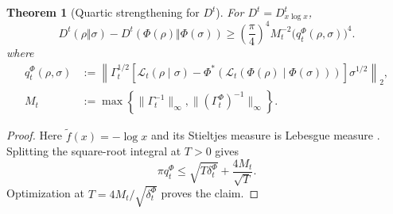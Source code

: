 \documentclass[11pt]{article}
\newtheorem{theorem}[theorem]{Theorem}
\theoremstyle{remark}
\newcommand{\1}{\mathbbm{1}}
\begin{document}
\begin{theorem}[Quartic strengthening for $D^t$]
\label{thm:consolidated-Dt-quartic}
For $D^t=D_{x\log x}^t$,
\begin{equation}
 \boxed{
 D^t(\rho\Vert\sigma)-D^t(\Phi(\rho)\Vert\Phi(\sigma))
 \geq\left(\frac\pi4\right)^4M_t^{-2}
 \bigl(q_t^\Phi(\rho,\sigma)\bigr)^4.}
 \label{eq:consolidated-Dt-quartic}
\end{equation}
where
\begin{align*}
 q_t^\Phi(\rho,\sigma)
 &:=\left\lVert\Gamma_t^{1/2}\left[
 \mathcal L_t(\rho\mid\sigma)
 -\Phi^*\!\left(\mathcal L_t(\Phi(\rho)\mid\Phi(\sigma))\right)
 \right]\sigma^{1/2}\right\rVert_2,\\
 M_t
 &:=\max\left\{\lVert\Gamma_t^{-1}\rVert_\infty,
 \lVert(\Gamma_t^\Phi)^{-1}\rVert_\infty\right\}.
\end{align*}
\end{theorem}

\begin{proof}
Here $\widetilde f(x)=-\log x$ and its Stieltjes measure is
Lebesgue measure \cite[Example~2.2]{carlen2018recovery}.  Splitting the square-root integral at $T>0$
gives
\begin{equation}
 \pi q_t^\Phi\leq
 \sqrt{T\delta_t^\Phi}+\frac{4M_t}{\sqrt T}.
\end{equation}
Optimization at $T=4M_t/\sqrt{\delta_t^\Phi}$ proves the claim.
\end{proof}
\end{document}
